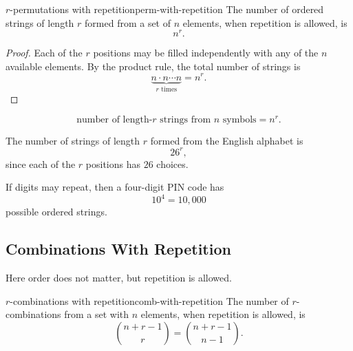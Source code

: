 \begin{theorem}{$r$-permutations with repetition}{perm-with-repetition}
The number of ordered strings of length $r$ formed from a set of $n$ elements, when repetition is allowed, is
\[
n^r.
\]
\end{theorem}

\begin{proof}
Each of the $r$ positions may be filled independently with any of the $n$ available elements. By the product rule, the total number of strings is
\[
\underbrace{n\cdot n\cdots n}_{r\text{ times}}=n^r.
\]
\end{proof}

\begin{keyformula}[title={Ordered selection with repetition}]
\[
\text{number of length-}r\text{ strings from }n\text{ symbols}=n^r.
\]
\end{keyformula}

\begin{examplebox}[title={Strings over the English alphabet}]
The number of strings of length $r$ formed from the English alphabet is
\[
26^r,
\]
since each of the $r$ positions has $26$ choices.
\end{examplebox}

\begin{examplebox}[title={Four-digit PIN code}]
If digits may repeat, then a four-digit PIN code has
\[
10^4=10{,}000
\]
possible ordered strings.
\end{examplebox}

\subsection{Combinations With Repetition}

Here order does not matter, but repetition is allowed.

\begin{theorem}{$r$-combinations with repetition}{comb-with-repetition}
The number of $r$-combinations from a set with $n$ elements, when repetition is allowed, is
\[
\binom{n+r-1}{r}=\binom{n+r-1}{n-1}.
\]
\end{theorem}

